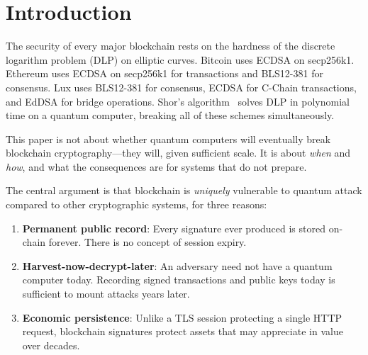 \section{Introduction}

\label{sec:introduction}

The security of every major blockchain rests on the hardness of the discrete logarithm
problem (DLP) on elliptic curves. Bitcoin uses ECDSA on secp256k1. Ethereum uses
ECDSA on secp256k1 for transactions and BLS12-381 for consensus. Lux uses BLS12-381
for consensus, ECDSA for C-Chain transactions, and EdDSA for bridge operations.
Shor's algorithm~\cite{shor1997} solves DLP in polynomial time on a quantum computer,
breaking all of these schemes simultaneously.

This paper is not about whether quantum computers will eventually break blockchain
cryptography---they will, given sufficient scale. It is about \emph{when} and
\emph{how}, and what the consequences are for systems that do not prepare.

The central argument is that blockchain is \emph{uniquely} vulnerable to quantum
attack compared to other cryptographic systems, for three reasons:

\begin{enumerate}[leftmargin=2em]
  \item \textbf{Permanent public record}: Every signature ever produced is stored
        on-chain forever. There is no concept of session expiry.
  \item \textbf{Harvest-now-decrypt-later}: An adversary need not have a quantum
        computer today. Recording signed transactions and public keys today is
        sufficient to mount attacks years later.
  \item \textbf{Economic persistence}: Unlike a TLS session protecting a single
        HTTP request, blockchain signatures protect assets that may appreciate in
        value over decades.
\end{enumerate}

